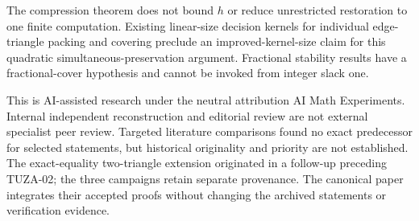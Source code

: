 \documentclass[11pt]{article}
\theoremstyle{definition}\newtheorem{definition}[theorem]{Definition}
\theoremstyle{remark}\newtheorem{remark}[theorem]{Remark}
\begin{document}
The compression theorem does not bound $h$ or reduce unrestricted restoration to one finite computation. Existing linear-size decision kernels for individual edge-triangle packing and covering \cite{ShengXiao} preclude an improved-kernel-size claim for this quadratic simultaneous-preservation argument. Fractional stability results \cite{HKT} have a fractional-cover hypothesis and cannot be invoked from integer slack one.

This is AI-assisted research under the neutral attribution AI Math Experiments. Internal independent reconstruction and editorial review are not external specialist peer review. Targeted literature comparisons found no exact predecessor for selected statements, but historical originality and priority are not established. The exact-equality two-triangle extension originated in a follow-up preceding TUZA-02; the three campaigns retain separate provenance. The canonical paper integrates their accepted proofs without changing the archived statements or verification evidence.


\end{document}
